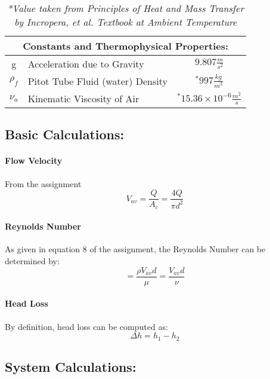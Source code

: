 \documentclass[12pt]{article}
\begin{document}
	\hfill\break\break
	\begin{table}
		\centering
		{
		\begin{tabular}{|c|l|c|}
		\hline
			\multicolumn{3}{|c|}{\textbf{Constants and Thermophysical Properties:}} \\
		\hline
		\hline
			g & Acceleration due to Gravity & $9.807\frac{m}{s^2}$\\
			$\rho_f$ & Pitot Tube Fluid (water) Density & $^*997\frac{kg}{m^3}$\\
			$\nu_a$ & Kinematic Viscosity of Air & $^*15.36\times10^{-6}\frac{m^2}{s}$\\
		\hline
		\end{tabular}
		}
		\caption*{\textit{*Value taken from \em{Principles of Heat and Mass Transfer by Incropera, et al.} Textbook at Ambient Temperature}}
	\end{table}


	\subsection{Basic Calculations:}
	\paragraph{Flow Velocity}
		From the assignment
		\begin{equation}
			V_{av} = \frac{Q}{A_{c}} = \frac{4Q}{\pi d^2}
		\end{equation}
		
	\paragraph{Reynolds Number}
	As given in equation 8 of the assignment, the Reynolds Number can be determined by:
	\begin{equation}
		[Re] = \frac{\rho V_{av}d}{\mu} = \frac{V_{av}d}{\nu}
	\end{equation}
	
	\paragraph{Head Loss}
	By definition, head loss can be computed as:
	\begin{equation}
 		\Delta h = h_1 - h_2
	\end{equation}
	
	\subsection{System Calculations:}
\end{document}
